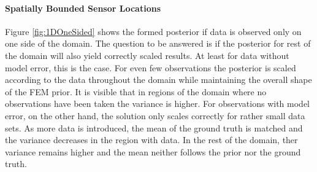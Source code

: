 \documentclass[%
  a4paper,oneside,%
  11pt,%
  smallchapters,
  style=printdev,
  extramargin,
  green,%
  rgb, <cmyk>
  ]{tubsbook}
\begin{document}
\paragraph{Spatially Bounded Sensor Locations}
\label{sec:spatBound}
Figure \ref{fig:1DOneSided} shows the formed posterior if data is observed only on one side of the domain. The question to be answered is if the posterior for rest of the domain will also yield correctly scaled results. At least for data without model error, this is the case. For even few observations the posterior is scaled according to the data throughout the domain while maintaining the overall shape of the FEM prior. It is visible that in regions of the domain where no observations have been taken the variance is higher. For observations with model error, on the other hand, the solution only scales correctly for rather small data sets. As more data is introduced, the mean of the ground truth is matched and the variance decreases in the region with data. In the rest of the domain, ther variance remains higher and the mean neither follows the prior nor the ground truth. %
%
\end{document}
